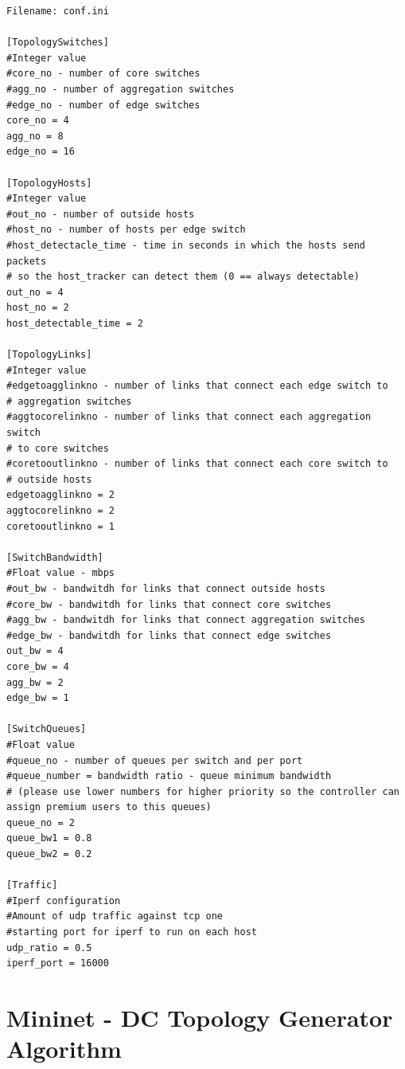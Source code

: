 \documentclass[12pt,english,oneside]{book}
\begin{document}
\begin{lstlisting}
Filename: conf.ini

[TopologySwitches]
#Integer value
#core_no - number of core switches
#agg_no - number of aggregation switches
#edge_no - number of edge switches
core_no = 4
agg_no = 8
edge_no = 16

[TopologyHosts]
#Integer value
#out_no - number of outside hosts
#host_no - number of hosts per edge switch
#host_detectacle_time - time in seconds in which the hosts send packets 
# so the host_tracker can detect them (0 == always detectable)
out_no = 4
host_no = 2
host_detectable_time = 2

[TopologyLinks]
#Integer value
#edgetoagglinkno - number of links that connect each edge switch to 
# aggregation switches
#aggtocorelinkno - number of links that connect each aggregation switch 
# to core switches
#coretooutlinkno - number of links that connect each core switch to 
# outside hosts
edgetoagglinkno = 2
aggtocorelinkno = 2
coretooutlinkno = 1

[SwitchBandwidth]
#Float value - mbps
#out_bw - bandwitdh for links that connect outside hosts
#core_bw - bandwitdh for links that connect core switches
#agg_bw - bandwitdh for links that connect aggregation switches
#edge_bw - bandwitdh for links that connect edge switches
out_bw = 4
core_bw = 4
agg_bw = 2
edge_bw = 1

[SwitchQueues]
#Float value
#queue_no - number of queues per switch and per port
#queue_number = bandwidth ratio - queue minimum bandwidth 
# (please use lower numbers for higher priority so the controller can assign premium users to this queues)  
queue_no = 2
queue_bw1 = 0.8
queue_bw2 = 0.2

[Traffic]
#Iperf configuration
#Amount of udp traffic against tcp one
#starting port for iperf to run on each host
udp_ratio = 0.5
iperf_port = 16000

\end{lstlisting}


\chapter{Mininet - DC Topology Generator Algorithm}
\label{app:tpalg}
\end{document}
